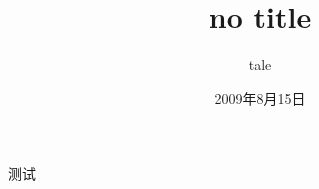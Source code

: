 \documentclass[b5paper, 10pt]{article}
\begin{document}
\title{no title}
\author{tale}
\date{2009年8月15日}

\setcounter{tocdepth}{2}
\tableofcontents

 测试
\end{document}
